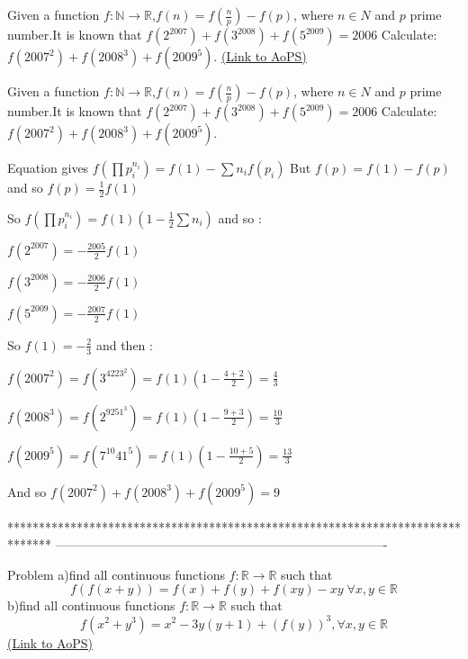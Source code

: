 \begin{problem}
	Given a function $f: \mathbb{N}\to\mathbb{R}$,$f(n)=f(\frac{n}{p})-f(p)$, where $n{\in}N$ and $p$ prime number.It is known that $f(2^{2007})+f(3^{2008})+f(5^{2009})=2006$ Calculate: $f(2007^2)+f(2008^3)+f(2009^5)$.
	\flushright \href{https://artofproblemsolving.com/community/c6h558506}{(Link to AoPS)}
\end{problem}



\begin{solution}
	\begin{tcolorbox}Given a function $f: \mathbb{N}\to\mathbb{R}$,$f(n)=f(\frac{n}{p})-f(p)$, where $n{\in}N$ and $p$ prime number.It is known that $f(2^{2007})+f(3^{2008})+f(5^{2009})=2006$ Calculate: $f(2007^2)+f(2008^3)+f(2009^5)$.\end{tcolorbox}
Equation gives $f(\prod p_i^{n_i})=f(1)-\sum n_if(p_i)$
But $f(p)=f(1)-f(p)$ and so $f(p)=\frac 12f(1)$

So $f(\prod p_i^{n_i})=f(1)(1-\frac 12\sum n_i)$ and so :

$f(2^{2007})=-\frac{2005}2f(1)$ 

$f(3^{2008})=-\frac{2006}2f(1)$ 

$f(5^{2009})=-\frac{2007}2f(1)$ 

So $f(1)=-\frac 23$ and then :

$f(2007^2)=f(3^4223^2)=f(1)(1-\frac{4+2}2)=\frac 43$

$f(2008^3)=f(2^9251^3)=f(1)(1-\frac{9+3}2)=\frac{10}3$

$f(2009^5)=f(7^{10}41^5)=f(1)(1-\frac{10+5}2)=\frac{13}3$

And so $\boxed{f(2007^2)+f(2008^3)+f(2009^5)=9}$
\end{solution}
*******************************************************************************
-------------------------------------------------------------------------------

\begin{problem}
	Problem 
a)find all continuous functions $f:\mathbb{R}\to\mathbb{R}$ such that
\[f(f(x+y))=f(x)+f(y)+f(xy)-xy\;\forall x,y\in\mathbb{R}\]
b)find all continuous functions $f:\mathbb{R}\to\mathbb{R}$ such that
\[f(x^2 +y^3)= x^2 - 3y(y+1) + (f(y))^3,\forall x,y\in\mathbb{R}\]
	\flushright \href{https://artofproblemsolving.com/community/c6h558732}{(Link to AoPS)}
\end{problem}



